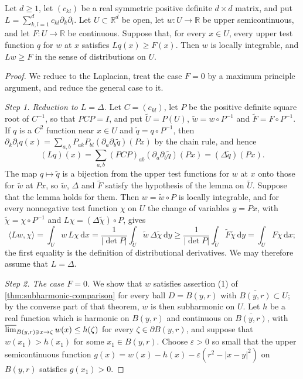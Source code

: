 \begin{lemma}\label{lem:constant-elliptic-upper-tests}
Let $d\ge1$, let $(c_{kl})$ be a real symmetric positive definite $d\times d$ matrix, and put $L=\sum_{k,l=1}^dc_{kl}\partial_k\partial_l$. Let $U\subset\mathbb R^d$ be open, let $w\colon U\to\mathbb R$ be upper semicontinuous, and let $F\colon U\to\mathbb R$ be continuous. Suppose that, for every $x\in U$, every upper test function $q$ for $w$ at $x$ satisfies $Lq(x)\ge F(x)$. Then $w$ is locally integrable, and $Lw\ge F$ in the sense of distributions on $U$.
\end{lemma}
\begin{proof}
We reduce to the Laplacian, treat the case $F=0$ by a maximum principle argument, and reduce the general case to it.

\emph{Step 1. Reduction to $L=\Delta$.} Let $C=(c_{kl})$, let $P$ be the positive definite square root of $C^{-1}$, so that $PCP=I$, and put $\tilde U=P(U)$, $\tilde w=w\circ P^{-1}$ and $\tilde F=F\circ P^{-1}$. If $q$ is a $C^2$ function near $x\in U$ and $\tilde q=q\circ P^{-1}$, then $\partial_k\partial_lq(x)=\sum_{a,b}P_{ak}P_{bl}(\partial_a\partial_b\tilde q)(Px)$ by the chain rule, and hence
\[
 (Lq)(x)=\sum_{a,b}(PCP)_{ab}(\partial_a\partial_b\tilde q)(Px)=(\Delta\tilde q)(Px).
\]
The map $q\mapsto\tilde q$ is a bijection from the upper test functions for $w$ at $x$ onto those for $\tilde w$ at $Px$, so $\tilde w$, $\Delta$ and $\tilde F$ satisfy the hypothesis of the lemma on $\tilde U$. Suppose that the lemma holds for them. Then $w=\tilde w\circ P$ is locally integrable, and for every nonnegative test function $\chi$ on $U$ the change of variables $y=Px$, with $\tilde\chi=\chi\circ P^{-1}$ and $L\chi=(\Delta\tilde\chi)\circ P$, gives
\[
 \langle Lw,\chi\rangle=\int_Uw\,L\chi\,\mathrm dx
 =\frac1{|\det P|}\int_{\tilde U}\tilde w\,\Delta\tilde\chi\,\mathrm dy
 \ge\frac1{|\det P|}\int_{\tilde U}\tilde F\tilde\chi\,\mathrm dy=\int_UF\chi\,\mathrm dx;
\]
the first equality is the definition of distributional derivatives. We may therefore assume that $L=\Delta$.

\emph{Step 2. The case $F=0$.} We show that $w$ satisfies assertion (1) of \cref{thm:subharmonic-comparison} for every ball $D=B(y,r)$ with $\overline{B(y,r)}\subset U$; by the converse part of that theorem, $w$ is then subharmonic on $U$. Let $h$ be a real function which is harmonic on $B(y,r)$ and continuous on $\overline{B(y,r)}$, with $\varlimsup_{B(y,r)\ni x\to\zeta}w(x)\le h(\zeta)$ for every $\zeta\in\partial B(y,r)$, and suppose that $w(x_1)>h(x_1)$ for some $x_1\in B(y,r)$. Choose $\varepsilon>0$ so small that the upper semicontinuous function $g(x)=w(x)-h(x)-\varepsilon(r^2-|x-y|^2)$ on $B(y,r)$ satisfies $g(x_1)>0$.


\end{proof}
